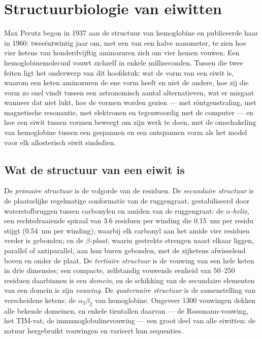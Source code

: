 \chapter{Structuurbiologie van eiwitten}\label{ch:b3:structural-biology}

Max Perutz begon in 1937 aan de structuur van hemoglobine en
publiceerde haar in 1960: tweeëntwintig jaar om, met een  van
een halve nanometer, te zien hoe vier ketens van honderdvijftig
aminozuren zich om vier hemen vouwen. Een hemoglobinemolecuul vouwt
zichzelf in enkele milliseconden. Tussen die twee feiten ligt het
onderwerp van dit hoofdstuk: wat de vorm van een eiwit is, waarom een
keten aminozuren de ene vorm heeft en niet de andere, hoe zij die vorm
zo snel vindt tussen een astronomisch aantal alternatieven, wat er
misgaat wanneer dat niet lukt, hoe de vormen worden gezien --- met
röntgenstraling, met magnetische resonantie, met elektronen en
tegenwoordig met de computer --- en hoe een eiwit tussen vormen beweegt
om zijn werk te doen, met de omschakeling van hemoglobine tussen een
gespannen en een ontspannen vorm als het model voor elk allosterisch
eiwit sindsdien.

\section{Wat de structuur van een eiwit is}

\begin{definition}[Structuurniveaus]\label{def:b3:structural-biology:levels}
De \emph{primaire structuur} is de volgorde van de residuen. De
\emph{secundaire structuur} is de plaatselijke regelmatige conformatie
van de ruggengraat, gestabiliseerd door waterstofbruggen tussen
carbonylen en amiden van de ruggengraat: de \emph{$\alpha$-helix}, een
rechtsdraaiende spiraal van $3.6$ residuen per winding die
\qty{0.15}{nm} per residu stijgt (\qty{0.54}{nm} per winding), waarbij
elk carbonyl aan het amide vier residuen verder is gebonden; en de
\emph{$\beta$-plaat}, waarin gestrekte strengen naast elkaar liggen,
parallel of antiparallel, aan hun buren gebonden, met de zijketens
afwisselend boven en onder de plaat. De \emph{tertiaire structuur} is
de vouwing van een hele keten in drie dimensies; een compacte,
zelfstandig vouwende eenheid van \numrange{50}{250} residuen daarbinnen
is een \emph{domein}, en de schikking van de secundaire elementen van
een domein is zijn \emph{vouwing}. De \emph{quaternaire structuur} is
de samenstelling van verscheidene ketens: de $\alpha_{2}\beta_{2}$ van
hemoglobine. Ongeveer \num{1300} vouwingen dekken alle bekende domeinen,
en enkele tientallen daarvan --- de Rossmann-vouwing, het TIM-vat, de
immunoglobulinevouwing --- een groot deel van alle eiwitten: de natuur
hergebruikt vouwingen en varieert hun sequenties.
\end{definition}

